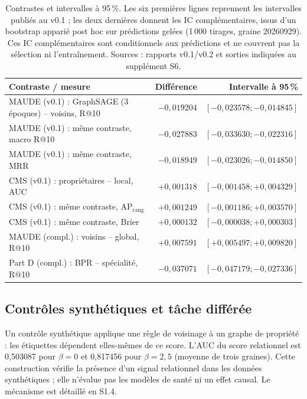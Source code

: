 \begin{table}[!htbp]
\centering\small
\caption{Contrastes et intervalles à 95\,\%. Les six premières lignes reprennent les intervalles publiés au v0.1 ; les deux dernières donnent les IC complémentaires, issus d'un bootstrap apparié post hoc sur prédictions gelées (1\,000 tirages, graine 20260929). Ces IC complémentaires sont conditionnels aux prédictions et ne couvrent pas la sélection ni l'entraînement. Sources : rapports v0.1/v0.2 et sorties indiquées au supplément S6\cite{hgbresults}.}
\label{tab:ci}
\begin{tabularx}{\linewidth}{@{}Xrr@{}}
\toprule
Contraste / mesure & Différence & Intervalle à 95\,\%\\
\midrule
MAUDE (v0.1) : GraphSAGE (3 époques) -- voisins, R@10 & $-0,019204$ & $[-0,023578;-0,014845]$\\
MAUDE (v0.1) : même contraste, macro R@10 & $-0,027883$ & $[-0,033630;-0,022316]$\\
MAUDE (v0.1) : même contraste, MRR & $-0,018949$ & $[-0,023026;-0,014850]$\\
CMS (v0.1) : propriétaires -- local, AUC & $+0,001318$ & $[-0,001458;+0,004329]$\\
CMS (v0.1) : même contraste, $\mathrm{AP}_{\mathrm{rang}}$ & $+0,001249$ & $[-0,001186;+0,003570]$\\
CMS (v0.1) : même contraste, Brier & $+0,000132$ & $[-0,000038;+0,000303]$\\
MAUDE (compl.) : voisins -- global, R@10 & $+0,007591$ & $[+0,005497;+0,009820]$\\
Part D (compl.) : BPR -- spécialité, R@10 & $-0,037071$ & $[-0,047179;-0,027336]$\\
\bottomrule
\end{tabularx}
\end{table}

\subsection{Contrôles synthétiques et tâche différée}

Un contrôle synthétique applique une règle de voisinage à un graphe de propriété : les étiquettes dépendent elles-mêmes de ce score. L'AUC du score relationnel est 0,503087 pour $\beta=0$ et 0,817456 pour $\beta=2,5$ (moyenne de trois graines)\cite{hgbcontrols}. Cette construction vérifie la présence d'un signal relationnel dans les données synthétiques ; elle n'évalue pas les modèles de santé ni un effet causal. Le mécanisme est détaillé en S1.4.


